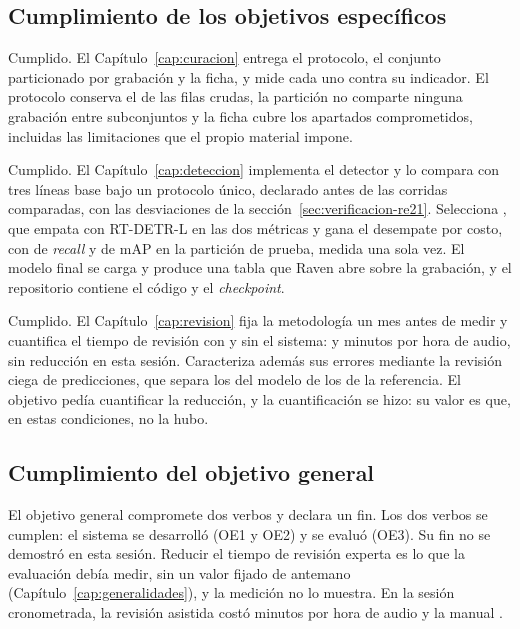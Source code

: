 \subsection{Cumplimiento de los objetivos específicos}

 Cumplido. El Capítulo~\ref{cap:curacion} entrega el protocolo, el
conjunto particionado por grabación y la ficha, y mide cada uno contra su
indicador. El protocolo conserva el \pctKept{} de las filas crudas, la partición
no comparte ninguna grabación entre subconjuntos y la ficha cubre los apartados
comprometidos, incluidas las limitaciones que el propio material impone.

 Cumplido. El Capítulo~\ref{cap:deteccion} implementa el detector y
lo compara con tres líneas base bajo un protocolo único, declarado antes de las
corridas comparadas, con las desviaciones de la
sección~\ref{sec:verificacion-re21}. Selecciona \rWinner{}, que empata con
RT-DETR-L en las dos métricas y gana el desempate por costo, con \rRecallYol{} de
\textit{recall} y \rMapYol{} de mAP en la partición de prueba, medida una sola
vez. El modelo final se carga y produce una tabla que Raven abre sobre la
grabación, y el repositorio contiene el código y el \textit{checkpoint}.

 Cumplido. El Capítulo~\ref{cap:revision} fija la metodología un
mes antes de medir y cuantifica el tiempo de revisión con y sin el sistema:
\uMinManual{} y \uMinAssisted{} minutos por hora de audio, sin reducción en esta
sesión. Caracteriza además sus errores mediante la revisión ciega de \uItems{}
predicciones, que separa los del modelo de los de la referencia. El objetivo
pedía cuantificar la reducción, y la cuantificación se hizo: su valor es que, en
estas condiciones, no la hubo.

\subsection{Cumplimiento del objetivo general}

 El objetivo general compromete dos verbos y
declara un fin. Los dos verbos se cumplen: el sistema se desarrolló (OE1 y OE2) y
se evaluó (OE3). Su fin no se demostró en esta sesión. Reducir el tiempo de
revisión experta es lo que la evaluación debía medir, sin un valor fijado de
antemano (Capítulo~\ref{cap:generalidades}), y la medición no lo muestra. En la
sesión cronometrada, la revisión asistida costó \uMinAssisted{} minutos por hora
de audio y la manual \uMinManual{}.


